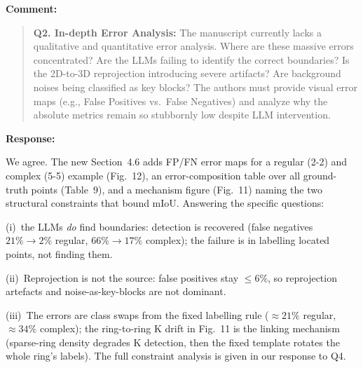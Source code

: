 \documentclass[11pt,a4paper]{article}
\newcommand{\MSErrorCompositionTable}{Table~9}
\newcommand{\MSErrorMechanismFigure}{Fig.~11}
\newcommand{\MSErrorMapFigure}{Fig.~12}
\newenvironment{commentblock}{%
  \par\smallskip\noindent\textbf{Comment:}\par
  \begin{quote}\itshape\color{black}
}{%
  \end{quote}\smallskip
}
\newenvironment{responseblock}{%
  \par\smallskip\noindent\textbf{Response:}\par
  \begingroup\color{responsegreen}
}{%
  \endgroup\smallskip
}
\begin{document}
\begin{commentblock}
\textbf{Q2. In-depth Error Analysis:} The manuscript currently lacks a qualitative and quantitative error analysis. Where are these massive errors concentrated? Are the LLMs failing to identify the correct boundaries? Is the 2D-to-3D reprojection introducing severe artifacts? Are background noises being classified as key blocks? The authors must provide visual error maps (e.g., False Positives vs.\ False Negatives) and analyze why the absolute metrics remain so stubbornly low despite LLM intervention.
\end{commentblock}
\begin{responseblock}
We agree. The new Section~4.6 adds FP/FN error maps for a regular (2-2) and complex (5-5) example (\MSErrorMapFigure), an error-composition table over all ground-truth points (\MSErrorCompositionTable), and a mechanism figure (\MSErrorMechanismFigure) naming the two structural constraints that bound mIoU. Answering the specific questions: 

(i)~the LLMs \emph{do} find boundaries: detection is recovered (false negatives $21\% \rightarrow 2\%$ regular, $66\% \rightarrow 17\%$ complex); the failure is in labelling located points, not finding them. 

(ii)~Reprojection is not the source: false positives stay $\leq 6\%$, so reprojection artefacts and noise-as-key-blocks are not dominant. 

(iii)~The errors are class swaps from the fixed labelling rule ($\approx 21\%$ regular, $\approx 34\%$ complex); the ring-to-ring K drift in \MSErrorMechanismFigure{} is the linking mechanism (sparse-ring density degrades K detection, then the fixed template rotates the whole ring's labels). The full constraint analysis is given in our response to Q4.
\end{responseblock}
\end{document}

